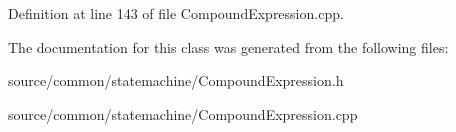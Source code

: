Definition at line 143 of file Compound\-Expression.\-cpp.



The documentation for this class was generated from the following files\-:\begin{DoxyCompactItemize}
\item 
source/common/statemachine/Compound\-Expression.\-h\item 
source/common/statemachine/Compound\-Expression.\-cpp\end{DoxyCompactItemize}
